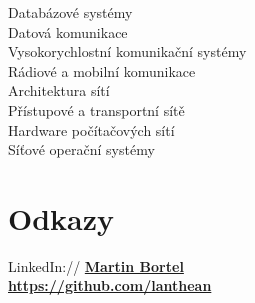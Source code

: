 \documentclass[letterpaper]{deedy-resume.cz} %
\begin{document}
\begin{minipage}[t]{0.39\textwidth}
\sectionspace %


Databázové systémy \\
Datová komunikace \\
Vysokorychlostní komunikační systémy \\
Rádiové a mobilní komunikace \\
Architektura sítí \\
Přístupové a transportní sítě \\
Hardware počítačových sítí \\
Síťové operační systémy

\sectionspace %

\section{Odkazy} 

LinkedIn:// \href{https://www.linkedin.com/in/martin-bortel-326b5227/}{\bf Martin Bortel} \\
\href{https://github.com/lanthean}{\bf https://github.com/lanthean} \\

\sectionspace %
\end{minipage} %
%
\end{document}
